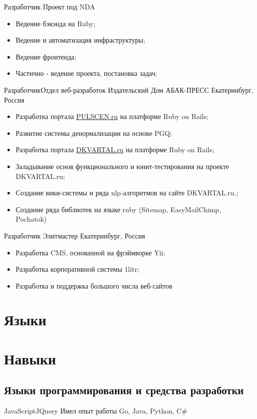 \documentclass[11pt,a4paper]{moderncv}
\begin{document}
  {Разработчик}{}
  {Проект под NDA}
  {}
{
\begin{itemize}
  \item Ведение бэкэнда на Ruby;
  \item Ведение и автоматизация инфраструктуры;
  \item Ведение фронтенда;
  \item Частично - ведение проекта, постановка задач;
\end{itemize}
}

  {Разработчик}{Отдел веб-разработок}
  {Издательский Дом АБАК-ПРЕСС}
  {Екатеринбург, Россия}
{
\begin{itemize}
  \item Разработка портала \href{http://pulscen.ru}{PULSCEN.ru} на платформе Ruby on Rails;
  \item Развитие системы денормализации на основе PGQ;
  \item Разработка портала \href{http://dkvartal.ru}{DKVARTAL.ru} на платформе Ruby on Rails;
  \item Заладывание основ функционального и юнит-тестирования на проекте {DKVARTAL.ru};
  \item Создание вики-системы и ряда nlp-алгоритмов на сайте {DKVARTAL.ru}.;
  \item Создание ряда библиотек на языке ruby (Sitemap, EasyMailChimp, Pochatok)
\end{itemize}
}

\cvitem {}{}

  {Разработчик}{}
  {Элитмастер}
  {Екатеринбург, Россия}
{
\begin{itemize}
  \item Разработка CMS, основанной на фрэймворке Yii;
  \item Разработка корпоративной системы {1litr};
  \item Разработка и поддержка большого числа веб-сайтов
\end{itemize}
}


\section{Языки}

\section{Навыки}
\subsection{Языки программирования и средства разработки}
{JavaScript}{JQuery}
\cvcomputer
{Имел опыт работы} {Go, Java, Python, C\#}
{}{}
\end{document}
